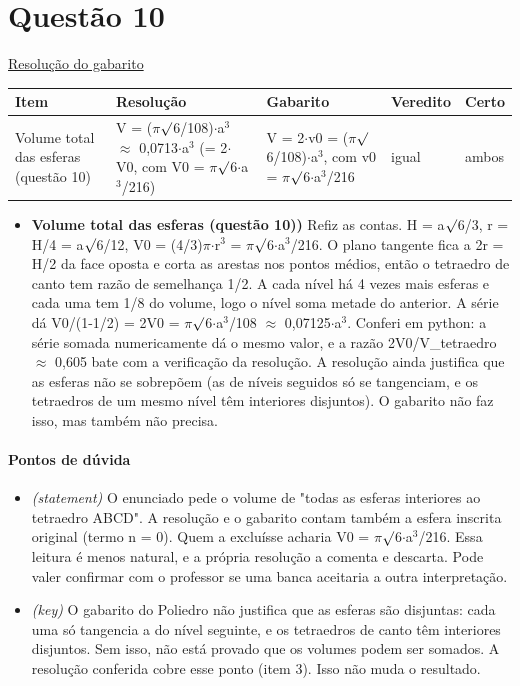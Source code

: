 \documentclass{article}%
\begin{document}
\section*{Questão 10}%
\href{https://poliedroresolve.sistemapoliedro.com.br/vestibulares/ime/2026/ime-2-fase-dia-1-23-10-2025-2-fase-dia-1/dissertativa-10-matematica-2-fase-dia-1-ime-2026}{Resolução do gabarito}\par\smallskip%
\begin{longtable}{@{}p{} p{} p{} p{} p{}@{}}\toprule Item & Resolução & Gabarito & Veredito & Certo \\ \midrule
Volume total das esferas (questão 10) & V = ($\pi$$\surd$6/108)$\cdot$a$^3$ $\approx$ 0,0713$\cdot$a$^3$ (= 2$\cdot$V0, com V0 = $\pi$$\surd$6$\cdot$a$^3$/216) & V = 2$\cdot$v0 = ($\pi$$\surd$6/108)$\cdot$a$^3$, com v0 = $\pi$$\surd$6$\cdot$a$^3$/216 & igual & ambos \\
\bottomrule\end{longtable}%
\begin{itemize}%
\item%
\textbf{Volume total das esferas (questão 10))} Refiz as contas. H = a$\surd$6/3, r = H/4 = a$\surd$6/12, V0 = (4/3)$\pi$$\cdot$r$^3$ = $\pi$$\surd$6$\cdot$a$^3$/216. O plano tangente fica a 2r = H/2 da face oposta e corta as arestas nos pontos médios, então o tetraedro de canto tem razão de semelhança 1/2. A cada nível há 4 vezes mais esferas e cada uma tem 1/8 do volume, logo o nível soma metade do anterior. A série dá V0/(1-1/2) = 2V0 = $\pi$$\surd$6$\cdot$a$^3$/108 $\approx$ 0,07125$\cdot$a$^3$. Conferi em python: a série somada numericamente dá o mesmo valor, e a razão 2V0/V\_tetraedro $\approx$ 0,605 bate com a verificação da resolução. A resolução ainda justifica que as esferas não se sobrepõem (as de níveis seguidos só se tangenciam, e os tetraedros de um mesmo nível têm interiores disjuntos). O gabarito não faz isso, mas também não precisa.%
\end{itemize}%
\paragraph{Pontos de dúvida}%
\begin{itemize}%
\item%
\textit{(statement)} O enunciado pede o volume de "todas as esferas interiores ao tetraedro ABCD". A resolução e o gabarito contam também a esfera inscrita original (termo n = 0). Quem a excluísse acharia V0 = $\pi$$\surd$6$\cdot$a$^3$/216. Essa leitura é menos natural, e a própria resolução a comenta e descarta. Pode valer confirmar com o professor se uma banca aceitaria a outra interpretação.%
\item%
\textit{(key)} O gabarito do Poliedro não justifica que as esferas são disjuntas: cada uma só tangencia a do nível seguinte, e os tetraedros de canto têm interiores disjuntos. Sem isso, não está provado que os volumes podem ser somados. A resolução conferida cobre esse ponto (item 3). Isso não muda o resultado.%
\end{itemize}%
\end{document}
